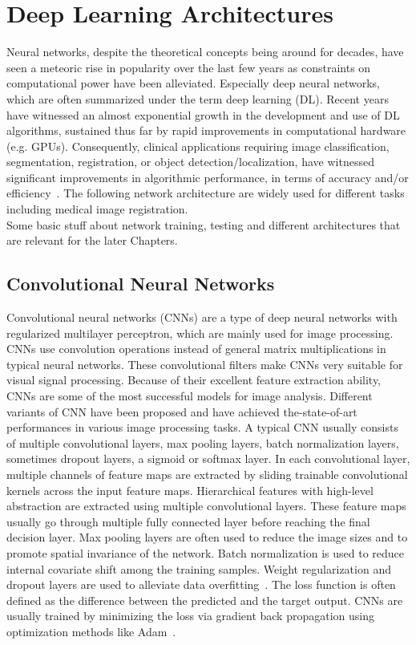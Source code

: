 \documentclass[english,version-2022-01]{uzl-thesis} %
\begin{document}
\section{Deep Learning Architectures} \label{Sec:DeepLearningArchitectures}
Neural networks, despite the theoretical concepts being around for decades, have seen a meteoric rise in popularity over the last few years as constraints on computational power have been alleviated. Especially deep neural networks, which are often summarized under the term deep learning (DL). Recent years have witnessed an almost exponential growth in the development and use of DL algorithms, sustained thus far by rapid improvements in computational hardware (e.g. GPUs). Consequently, clinical applications requiring image classification, segmentation, registration, or object detection/localization, have witnessed significant improvements in algorithmic performance, in terms of accuracy and/or efficiency~\cite{Chen2020}. The following network architecture are widely used for different tasks including medical image registration. \\
Some basic stuff about network training, testing and different architectures that are relevant for the later Chapters.

\subsection{Convolutional Neural Networks} \label{SubSec:CNNs}
Convolutional neural networks (CNNs) are a type of deep neural networks with regularized multilayer perceptron, which are mainly used for image processing. CNNs use convolution operations instead of general matrix multiplications in typical neural networks. These convolutional filters make CNNs very suitable for visual signal processing. Because of their excellent feature extraction ability, CNNs are some of the most successful models for image analysis. Different variants of CNN have been proposed and have achieved the-state-of-art performances in various image processing tasks. A typical CNN usually consists of multiple convolutional layers, max pooling layers, batch normalization layers, sometimes dropout layers, a sigmoid or softmax layer. In each convolutional layer, multiple channels of feature maps are extracted by sliding trainable convolutional kernels across the input feature maps. Hierarchical features with high-level abstraction are extracted using multiple convolutional layers. These feature maps usually go through multiple fully connected layer before reaching the final decision layer. Max pooling layers are often used to reduce the image sizes and to promote spatial invariance of the network. Batch normalization is used to reduce internal covariate shift among the training samples. Weight regularization and dropout layers are used to alleviate data overfitting~\cite{Fu2020}. The loss function is often defined as the difference between the predicted and the target output. CNNs are usually trained by minimizing the loss via gradient back propagation using optimization methods like Adam~\cite{Adam}. 
\end{document}
